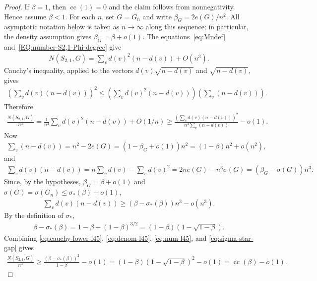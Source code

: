 \documentclass[10pt,a4paper]{article}
\newcommand{\cc}{\operatorname{cc}}
\begin{document}
\begin{proof}
If $\beta=1$, then $\cc(1)=0$ and the claim follows from nonnegativity.  Hence
assume $\beta<1$.  For each $n$, set $G=G_n$ and write
$\beta_G=2e(G)/n^2$.  All asymptotic notation below is taken as $n\to\infty$
along this sequence; in particular, the density assumption gives
$\beta_G=\beta+o(1)$.  The equations~\eqref{eq:Mndef} and~\eqref{EQ:number-S2,1-Phi-degree} give
\begin{align*}
N(S_{2,1},G)
=\sum_v d(v)^2(n-d(v))+O(n^3).
\end{align*}
Cauchy's inequality, applied to the vectors $d(v)\sqrt{n-d(v)}$ and $\sqrt{n-d(v)}$, gives
\begin{align*}
  \left(\sum_v d(v)(n-d(v))\right)^2
  \le
  \left(\sum_v d(v)^2(n-d(v))\right)
  \left(\sum_v (n-d(v))\right).
\end{align*}
Therefore
\begin{align}\label{eq:cauchy-lower-l45}
  \frac{N(S_{2,1},G)}{n^4}=\frac{1}{n^4}\sum_v d(v)^2(n-d(v))+O(1/n)
  \ge
  \frac{\left(\sum_v d(v)(n-d(v))\right)^2}{n^4\sum_v(n-d(v))}-o(1).
\end{align}
Now
\begin{align}\label{eq:denom-l45}
  \sum_v(n-d(v))=n^2-2e(G)=(1-\beta_G+o(1))n^2=(1-\beta)n^2+o(n^2),
\end{align}
and
\begin{align*}
  \sum_v d(v)(n-d(v))
  =n\sum_v d(v)-\sum_v d(v)^2
  =2ne(G)-n^3\sigma(G)
  =(\beta_G-\sigma(G))n^3.
\end{align*}
Since, by the hypotheses, $\beta_G=\beta+o(1)$ and
$\sigma(G)=\sigma(G_n)\le\sigma_*(\beta)+o(1)$,
\begin{align}\label{eq:num-l45}
  \sum_v d(v)(n-d(v))\ge(\beta-\sigma_*(\beta))n^3-o(n^3).
\end{align}
By the definition of $\sigma_*$,
\begin{align}\label{eq:sigma-star-gap}
  \beta-\sigma_*(\beta)=1-\beta-(1-\beta)^{3/2}=(1-\beta)(1-\sqrt{1-\beta}).
\end{align}
Combining \eqref{eq:cauchy-lower-l45}, \eqref{eq:denom-l45}, \eqref{eq:num-l45}, and \eqref{eq:sigma-star-gap} gives
\begin{align*}
  \frac{N(S_{2,1},G)}{n^4}
  \ge \frac{(\beta-\sigma_*(\beta))^2}{1-\beta}-o(1)
  =(1-\beta)(1-\sqrt{1-\beta})^2-o(1)
  =\cc(\beta)-o(1).
\end{align*}
\end{proof}
\end{document}
